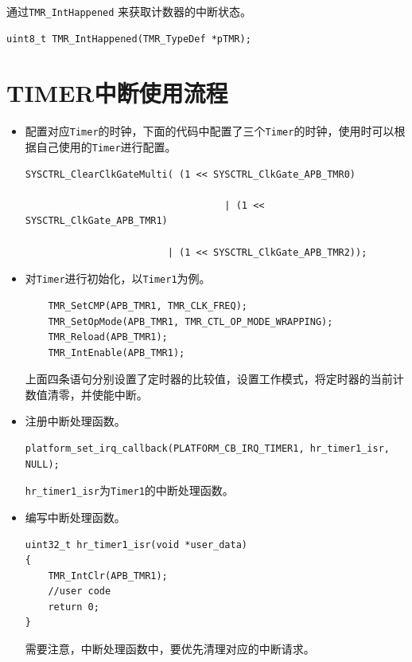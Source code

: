 \documentclass[
  12pt,
]{book}
\begin{document}
通过\texttt{TMR\_IntHappened} 来获取计数器的中断状态。

\begin{verbatim}
uint8_t TMR_IntHappened(TMR_TypeDef *pTMR);
\end{verbatim}

\hypertarget{timerux4e2dux65adux4f7fux7528ux6d41ux7a0b}{%
\section{TIMER中断使用流程}\label{timerux4e2dux65adux4f7fux7528ux6d41ux7a0b}}

\begin{itemize}
\item
  配置对应\texttt{Timer}的时钟，下面的代码中配置了三个\texttt{Timer}的时钟，使用时可以根据自己使用的\texttt{Timer}进行配置。

\begin{verbatim}
SYSCTRL_ClearClkGateMulti( (1 << SYSCTRL_ClkGate_APB_TMR0)

                                   | (1 << SYSCTRL_ClkGate_APB_TMR1)

                         | (1 << SYSCTRL_ClkGate_APB_TMR2));
\end{verbatim}
\item
  对\texttt{Timer}进行初始化，以\texttt{Timer1}为例。

\begin{verbatim}
    TMR_SetCMP(APB_TMR1, TMR_CLK_FREQ);
    TMR_SetOpMode(APB_TMR1, TMR_CTL_OP_MODE_WRAPPING);
    TMR_Reload(APB_TMR1);
    TMR_IntEnable(APB_TMR1);
\end{verbatim}

  上面四条语句分别设置了定时器的比较值，设置工作模式，将定时器的当前计数值清零，并使能中断。
\item
  注册中断处理函数。

\begin{verbatim}
platform_set_irq_callback(PLATFORM_CB_IRQ_TIMER1, hr_timer1_isr, NULL);
\end{verbatim}

  \texttt{hr\_timer1\_isr}为\texttt{Timer1}的中断处理函数。
\item
  编写中断处理函数。

\begin{verbatim}
uint32_t hr_timer1_isr(void *user_data)
{
    TMR_IntClr(APB_TMR1);
    //user code
    return 0;
}
\end{verbatim}

  需要注意，中断处理函数中，要优先清理对应的中断请求。
\end{itemize}
\end{document}

